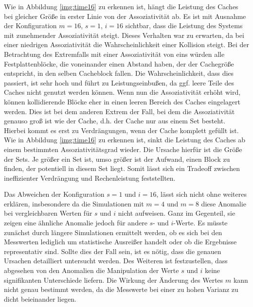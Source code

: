 Wie in Abbildung \ref{img:time16} zu erkennen ist, hängt die Leistung des Caches bei gleicher Größe in erster Linie von der Assoziativität ab. Es ist mit
Ausnahme der Konfiguration $m=16$, $s=1$, $i=16$ sichtbar, dass die Leistung des Systems mit zunehmender Assoziativität steigt. Dieses Verhalten war zu erwarten,
da bei einer niedrigen Assoziativität die Wahrscheinlichkeit einer Kollision steigt. Bei der Betrachtung des Extremfalls mit einer Assoziativität von eins würden
alle Festplattenblöcke, die voneinander einen Abstand haben, der der Cachegröße entspricht, in den selben Cacheblock fallen. Die Wahrscheinlichkeit, dass dies
passiert, ist sehr hoch und führt zu Leistungseinbußen, da ggf. leere Teile des Caches nicht genutzt werden können. Wenn nun die Assoziativität erhöht wird,
können kollidierende Blöcke eher in einen leeren Bereich des Caches eingelagert werden. Dies ist bei dem anderen Extrem der Fall, bei dem die Assoziativität
genauso groß ist wie der Cache, d.h. der Cache nur aus einem Set besteht. Hierbei kommt es erst zu Verdrängungen, wenn der Cache komplett gefüllt ist. Wie in
Abbildung \ref{img:time16} zu erkennen ist, sinkt die Leistung des Caches ab einem bestimmten Assoziativitätsgrad wieder. Die Ursache hierfür ist die Größe der
Sets. Je größer ein Set ist, umso größer ist der Aufwand, einen Block zu finden, der potentiell in diesem Set liegt. Somit lässt sich ein Tradeoff zwischen
ineffizienter Verdrängung und Rechenleistung feststellten.

Das Abweichen der Konfiguration $s=1$ und $i=16$, lässt sich nicht ohne weiteres erklären, insbesondere da die Simulationen mit $m=4$ und $m=8$ diese Anomalie
bei vergleichbaren Werten für $s$ und $i$ nicht aufweisen. Ganz im Gegenteil, sie zeigen eine ähnliche Anomalie jedoch für andere $s$- und $i$-Werte. Es müsste
zunächst durch längere Simulationen ermittelt werden, ob es sich bei den Messwerten lediglich um statistische Ausreißer handelt oder ob die Ergebnisse
representativ sind. Sollte dies der Fall sein, ist es nötig, dass die genauen Ursachen detailliert untersucht werden. Des Weiteren ist festzustellen, dass
abgesehen von den Anomalien die Manipulation der Werte $s$ und $i$ keine signifikanten Unterschiede liefern. Die Wirkung der Änderung des Wertes $m$ kann nicht
genau bestimmt werden, da die Messwerte bei einer zu hohen Varianz zu dicht beieinander liegen.

